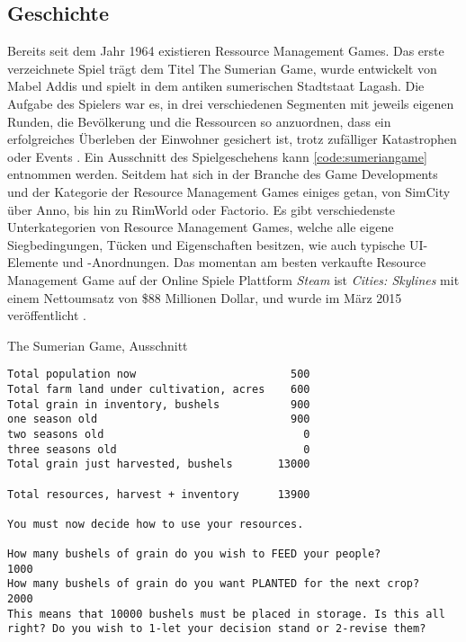 \subsection{Geschichte}
Bereits seit dem Jahr 1964 existieren Ressource Management Games. Das erste verzeichnete Spiel trägt dem Titel \glqq The Sumerian Game\grqq, wurde entwickelt von Mabel Addis und spielt in dem antiken sumerischen Stadtstaat Lagash. Die Aufgabe des Spielers war es, in drei verschiedenen Segmenten mit jeweils eigenen Runden, die Bevölkerung und die Ressourcen so anzuordnen, dass ein erfolgreiches Überleben der Einwohner gesichert ist, trotz zufälliger Katastrophen oder Events \cite*[]{sumeriangame}. Ein Ausschnitt des Spielgeschehens kann \autoref{code:sumeriangame} entnommen werden. 
 Seitdem hat sich in der Branche des Game Developments und der Kategorie der Resource Management Games einiges getan, von SimCity über Anno, bis hin zu RimWorld oder Factorio. Es gibt verschiedenste Unterkategorien von Resource Management Games, welche alle eigene Siegbedingungen, Tücken und Eigenschaften besitzen, wie auch typische UI-Elemente und -Anordnungen. Das momentan am besten verkaufte Resource Management Game auf der Online Spiele Plattform \textit{Steam} ist \textit{Cities: Skylines} mit einem Nettoumsatz von \$88 Millionen Dollar, und wurde im März 2015 veröffentlicht \cite*[]{rmgstatistics}.

\begin{listing}[H]
\caption{The Sumerian Game, Ausschnitt}
\label{code:sumeriangame}
\begin{verbatim}
Total population now                        500
Total farm land under cultivation, acres    600
Total grain in inventory, bushels           900
one season old                              900
two seasons old                               0
three seasons old                             0
Total grain just harvested, bushels       13000

Total resources, harvest + inventory      13900

You must now decide how to use your resources.

How many bushels of grain do you wish to FEED your people?
1000
How many bushels of grain do you want PLANTED for the next crop?
2000
This means that 10000 bushels must be placed in storage. Is this all 
right? Do you wish to 1-let your decision stand or 2-revise them?
\end{verbatim}
\end{listing}